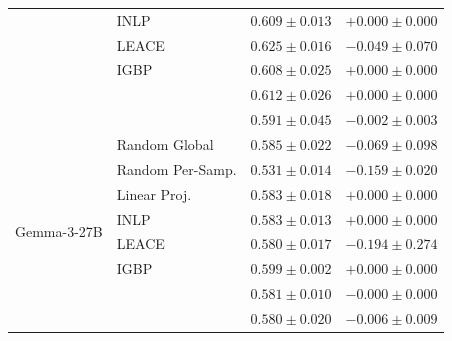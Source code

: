 \begin{longtable}{ll rr}
   & INLP & $0.609{\pm}0.013$ & $+0.000{\pm}0.000$ \\
   & LEACE & $0.625{\pm}0.016$ & $-0.049{\pm}0.070$ \\
   & IGBP & $0.608{\pm}0.025$ & $+0.000{\pm}0.000$ \\
   & \AmbGCE{} & $0.612{\pm}0.026$ & $+0.000{\pm}0.000$ \\
   & \TanGCE{} & \textbf{$0.591{\pm}0.045$} & $-0.002{\pm}0.003$ \\
  \midrule
  \multirow{8}{*}{Gemma-3-27B} & Random Global & $0.585{\pm}0.022$ & $-0.069{\pm}0.098$ \\
   & Random Per-Samp. & $0.531{\pm}0.014$ & $-0.159{\pm}0.020$ \\
   & Linear Proj. & $0.583{\pm}0.018$ & $+0.000{\pm}0.000$ \\
   & INLP & $0.583{\pm}0.013$ & $+0.000{\pm}0.000$ \\
   & LEACE & $0.580{\pm}0.017$ & $-0.194{\pm}0.274$ \\
   & IGBP & $0.599{\pm}0.002$ & $+0.000{\pm}0.000$ \\
   & \AmbGCE{} & $0.581{\pm}0.010$ & $-0.000{\pm}0.000$ \\
   & \TanGCE{} & \textbf{$0.580{\pm}0.020$} & $-0.006{\pm}0.009$ \\
\end{longtable}


